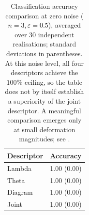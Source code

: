 \begin{table}[htbp]\centering
\caption{Classification accuracy comparison at zero noise
(\(n=3, \varepsilon=0.5\)), averaged over 30 independent realisations;
standard deviations in parentheses. At this noise level, all four descriptors
achieve the \(100\%\) ceiling, so the table does not by itself establish a
superiority of the joint descriptor. A meaningful comparison emerges only at
small deformation magnitudes; see .}
\label{tab:baseline}
\begin{tabular}{lc}\hline
Descriptor & Accuracy \\\hline
Lambda & 1.00 (0.00) \\
Theta & 1.00 (0.00) \\
Diagram & 1.00 (0.00) \\
Joint & 1.00 (0.00) \\
\hline\end{tabular}\end{table}